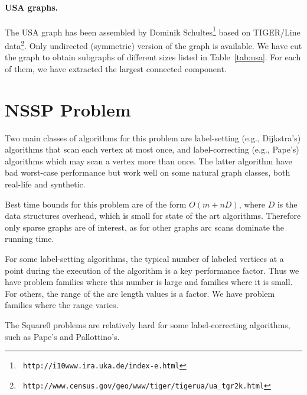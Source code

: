 \documentclass[11pt]{article}
\begin{document}

\paragraph{USA graphs.}
The USA graph has been assembled by Dominik Schultes\footnote{\tt
http://i10www.ira.uka.de/index-e.html} based on TIGER/Line
data\footnote{\tt
http://www.census.gov/geo/www/tiger/tigerua/ua\_tgr2k.html}. Only
undirected (symmetric) version of the graph is available. We have
cut the graph to obtain subgraphs of different sizes listed in
Table~\ref{tab:usa}. For each of them, we have extracted the
largest connected component.


\section{NSSP Problem}

Two main classes of algorithms for this problem are label-setting
(e.g., Dijkstra's) algorithms that scan each vertex at most once,
and label-correcting (e.g., Pape's) algorithms which may scan a vertex
more than once.
The latter algorithm have bad worst-case performance but work
well on some natural graph classes, both real-life and synthetic.

Best time bounds for this problem are of the form $O(m + nD)$,
where $D$ is the data structures overhead, which is small for
state of the art algorithms.
Therefore only sparse graphs are of interest, as for other graphs
arc scans dominate the running time.

For some label-setting algorithms, the typical number
of labeled vertices at a point during the execution of the
algorithm is a key performance factor.
Thus we have problem families where this number is large and
families where it is small.
For others, the range of the arc length values is a factor.
We have problem families where the range varies.

The Square0 problems are relatively hard for some label-correcting 
algorithms, such as Pape's and Pallottino's.
\end{document}
